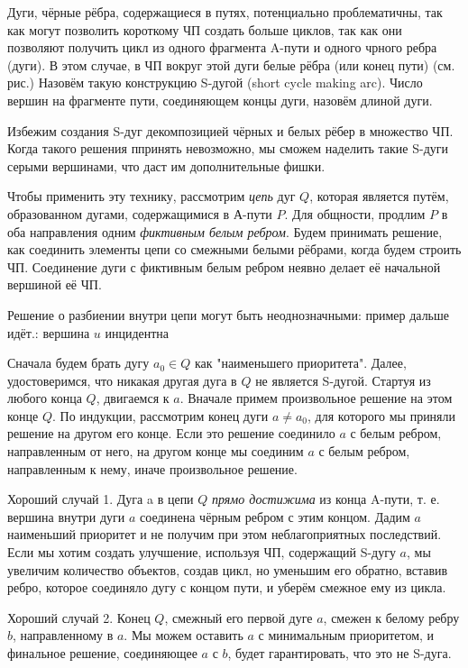 \begin{proofstar}
Дуги, чёрные рёбра, содержащиеся в путях, потенциально проблематичны, так как могут позволить короткому ЧП создать больше циклов, так как они позволяют получить цикл из одного фрагмента A-пути и одного чрного ребра (дуги). В этом случае, в ЧП вокруг этой дуги белые рёбра (или конец пути) (см. рис.) Назовём такую конструкцию S-дугой (short cycle making arc). Число вершин на фрагменте пути, соединяющем концы дуги, назовём длиной дуги.

Избежим создания S-дуг декомпозицией чёрных и белых рёбер в множество ЧП. Когда такого решения ппринять невозможно, мы сможем наделить такие S-дуги серыми вершинами, что даст им дополнительные фишки. 

Чтобы применить эту технику, рассмотрим \textit{цепь} дуг $Q$, которая является путём, образованном дугами, содержащимися в А-пути $P$. Для общности, продлим $P$ в оба направления одним \textit{фиктивным белым ребром}. Будем принимать решение, как соединить элементы цепи со смежными белыми рёбрами, когда будем строить ЧП. Соединение дуги с фиктивным белым ребром неявно делает её начальной вершиной её ЧП.

Решение о разбиении внутри цепи могут быть неоднозначными: пример дальше идёт.: вершина $u$ инцидентна 

Сначала будем брать дугу $a_0 \in Q$ как "наименьшего приоритета". Далее, удостоверимся, что никакая другая дуга в $Q$ не является S-дугой. Стартуя из любого конца $Q$, двигаемся к $a$. Вначале примем произвольное решение на этом конце $Q$. По индукции, рассмотрим конец дуги $a \ne a_0$, для которого мы приняли решение на другом его конце. Если это решение соединило $a$ с белым ребром, направленным от него, на другом конце мы соединим $a$ с белым ребром, направленным к нему, иначе произвольное решение.

Хороший случай 1.
Дуга a в цепи $Q$ \textit{прямо достижима} из конца A-пути, т. е. вершина внутри дуги $a$ соединена чёрным ребром с этим концом. Дадим $a$ наименьший приоритет и не получим при этом неблагоприятных последствий. Если мы хотим создать улучшение, используя ЧП, содержащий S-дугу $a$, мы увеличим количество объектов, создав цикл, но уменьшим его обратно, вставив ребро, которое соединяло дугу с концом пути, и уберём смежное ему из цикла.

Хороший случай 2.
Конец $Q$, смежный его первой дуге $a$, смежен к белому ребру $b$, направленному в $a$. Мы можем оставить $a$ с минимальным приоритетом, и финальное решение, соединяющее $a$ с $b$, будет гарантировать, что это не S-дуга.


\end{proofstar}
